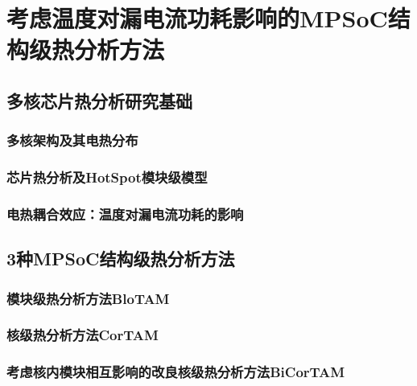 

\chapter{考虑温度对漏电流功耗影响的MPSoC结构级热分析方法}
\label{cha:SSTA}


\section{多核芯片热分析研究基础}
\label{sec:SSTAbasic}

\subsection{多核架构及其电热分布}

\subsection{芯片热分析及HotSpot模块级模型}

\subsection{电热耦合效应：温度对漏电流功耗的影响}





\section{3种MPSoC结构级热分析方法}
\label{sec:SSTAmethod}

\subsection{模块级热分析方法BloTAM}

\subsection{核级热分析方法CorTAM}

\subsection{考虑核内模块相互影响的改良核级热分析方法BiCorTAM}











